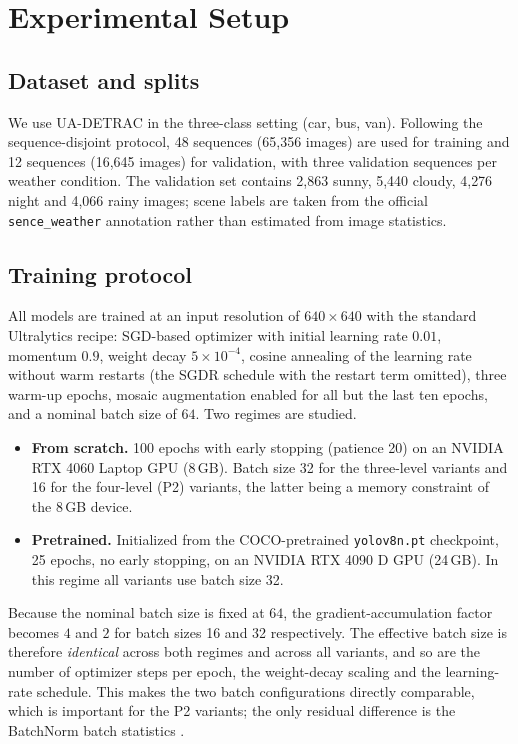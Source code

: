 \documentclass[pdflatex,sn-basic,Numbered]{sn-jnl}%
\begin{document}
\section{Experimental Setup}\label{sec:setup}

\subsection{Dataset and splits}

We use UA-DETRAC \cite{wen2020uadetrac} in the three-class setting (car, bus, van). Following the sequence-disjoint protocol, 48 sequences (65{,}356 images) are used for training and 12 sequences (16{,}645 images) for validation, with three validation sequences per weather condition. The validation set contains 2{,}863 sunny, 5{,}440 cloudy, 4{,}276 night and 4{,}066 rainy images; scene labels are taken from the official \texttt{sence\_weather} annotation rather than estimated from image statistics.

\subsection{Training protocol}

All models are trained at an input resolution of $640\times640$ with the standard Ultralytics recipe: SGD-based optimizer with initial learning rate $0.01$, momentum $0.9$, weight decay $5\times10^{-4}$, cosine annealing of the learning rate without warm restarts (the SGDR schedule \cite{loshchilov2017sgdr} with the restart term omitted), three warm-up epochs, mosaic augmentation enabled for all but the last ten epochs, and a nominal batch size of $64$. Two regimes are studied.
\begin{itemize}
\item \textbf{From scratch.} 100 epochs with early stopping (patience 20) on an NVIDIA RTX 4060 Laptop GPU (8\,GB). Batch size 32 for the three-level variants and 16 for the four-level (P2) variants, the latter being a memory constraint of the 8\,GB device.
\item \textbf{Pretrained.} Initialized from the COCO-pretrained \texttt{yolov8n.pt} checkpoint, 25 epochs, no early stopping, on an NVIDIA RTX 4090 D GPU (24\,GB). In this regime all variants use batch size 32.
\end{itemize}
Because the nominal batch size is fixed at $64$, the gradient-accumulation factor becomes $4$ and $2$ for batch sizes 16 and 32 respectively. The effective batch size is therefore \emph{identical} across both regimes and across all variants, and so are the number of optimizer steps per epoch, the weight-decay scaling and the learning-rate schedule. This makes the two batch configurations directly comparable, which is important for the P2 variants; the only residual difference is the BatchNorm batch statistics \cite{ioffe2015batchnorm}.
\end{document}
